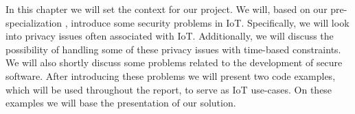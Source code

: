 
In this chapter we will set the context for our project.
We will, based on our pre-specialization \cite{prespecialization}, introduce some security problems in IoT.
Specifically, we will look into privacy issues often associated with IoT.
Additionally, we will discuss the possibility of handling some of these privacy issues with time-based constraints.
We will also shortly discuss some problems related to the development of secure software.
After introducing these problems we will present two code examples, which will be used throughout the report, to serve as IoT use-cases.
On these examples we will base the presentation of our solution.
